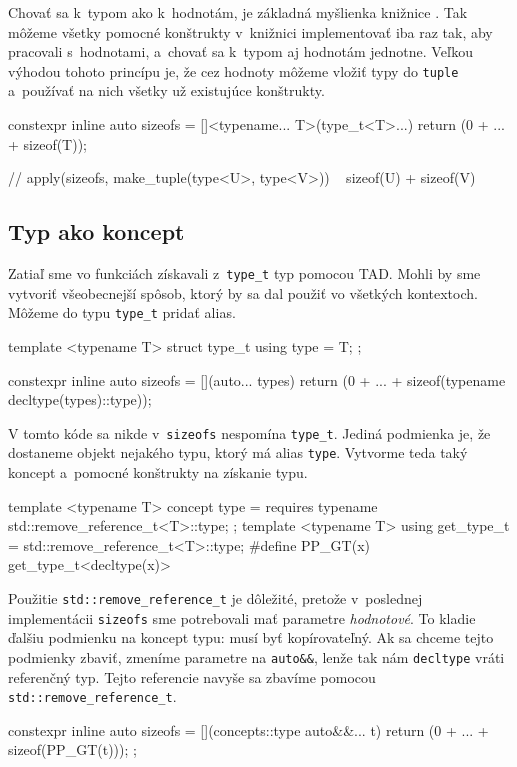 Chovať sa k~typom ako k~hodnotám, je základná myšlienka knižnice \PP{}. Tak môžeme všetky pomocné konštrukty v~knižnici implementovať iba raz tak, aby pracovali s~hodnotami, a~chovať sa k~typom aj hodnotám jednotne. Veľkou výhodou tohoto princípu je, že cez hodnoty môžeme vložiť typy do \texttt{tuple} a~používať na nich všetky už existujúce konštrukty.
\begin{code}
constexpr inline auto sizeofs = []<typename... T>(type_t<T>...)
                                { return (0 + ... + sizeof(T)); }

// apply(sizeofs, make_tuple(type<U>, type<V>)) ~ sizeof(U) + sizeof(V)
\end{code}

\subsection{Typ ako koncept}

Zatiaľ sme vo funkciách získavali z~\texttt{type\_t} typ pomocou TAD. Mohli by sme vytvoriť všeobecnejší spôsob, ktorý by sa dal použiť vo všetkých kontextoch. Môžeme do typu \texttt{type\_t} pridať alias.
\begin{code}
template <typename T> struct type_t { using type = T; };

constexpr inline auto sizeofs =
    [](auto... types)
    { return (0 + ... + sizeof(typename decltype(types)::type)); }
\end{code}
V tomto kóde sa nikde v~\texttt{sizeofs} nespomína \texttt{type\_t}. Jediná podmienka je, že dostaneme objekt nejakého typu, ktorý má alias \texttt{type}. Vytvorme teda taký koncept a~pomocné konštrukty na získanie typu.
\begin{code}
template <typename T>
concept type = requires { typename std::remove_reference_t<T>::type; };
template <typename T>
using get_type_t = std::remove_reference_t<T>::type;
#define PP_GT(x) get_type_t<decltype(x)>
\end{code}
Použitie \texttt{std::remove\_reference\_t} je dôležité, pretože v~poslednej implementácii \texttt{sizeofs} sme potrebovali mať parametre \emph{hodnotové}. To kladie ďalšiu podmienku na koncept typu: musí byť kopírovateľný. Ak sa chceme tejto podmienky zbaviť, zmeníme parametre na \texttt{auto\&\&}, lenže tak nám \texttt{decltype} vráti referenčný typ. Tejto referencie navyše sa zbavíme pomocou \texttt{std::remove\_reference\_t}.
\begin{code}
constexpr inline auto sizeofs =
    [](concepts::type auto&&... t)
    { return (0 + ... + sizeof(PP_GT(t))); };
\end{code}

